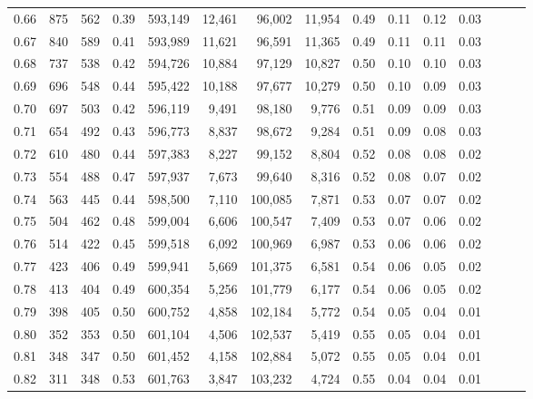 \begin{tabular}{rrrrrrrrrrrrrrr}
0.66 &     875 &    562 &  0.39 &  593,149 &   12,461 &   96,002 &   11,954 &  0.49 &  0.11 &  0.12 &      0.03 \\
0.67 &     840 &    589 &  0.41 &  593,989 &   11,621 &   96,591 &   11,365 &  0.49 &  0.11 &  0.11 &      0.03 \\
0.68 &     737 &    538 &  0.42 &  594,726 &   10,884 &   97,129 &   10,827 &  0.50 &  0.10 &  0.10 &      0.03 \\
0.69 &     696 &    548 &  0.44 &  595,422 &   10,188 &   97,677 &   10,279 &  0.50 &  0.10 &  0.09 &      0.03 \\
0.70 &     697 &    503 &  0.42 &  596,119 &    9,491 &   98,180 &    9,776 &  0.51 &  0.09 &  0.09 &      0.03 \\
0.71 &     654 &    492 &  0.43 &  596,773 &    8,837 &   98,672 &    9,284 &  0.51 &  0.09 &  0.08 &      0.03 \\
0.72 &     610 &    480 &  0.44 &  597,383 &    8,227 &   99,152 &    8,804 &  0.52 &  0.08 &  0.08 &      0.02 \\
0.73 &     554 &    488 &  0.47 &  597,937 &    7,673 &   99,640 &    8,316 &  0.52 &  0.08 &  0.07 &      0.02 \\
0.74 &     563 &    445 &  0.44 &  598,500 &    7,110 &  100,085 &    7,871 &  0.53 &  0.07 &  0.07 &      0.02 \\
0.75 &     504 &    462 &  0.48 &  599,004 &    6,606 &  100,547 &    7,409 &  0.53 &  0.07 &  0.06 &      0.02 \\
0.76 &     514 &    422 &  0.45 &  599,518 &    6,092 &  100,969 &    6,987 &  0.53 &  0.06 &  0.06 &      0.02 \\
0.77 &     423 &    406 &  0.49 &  599,941 &    5,669 &  101,375 &    6,581 &  0.54 &  0.06 &  0.05 &      0.02 \\
0.78 &     413 &    404 &  0.49 &  600,354 &    5,256 &  101,779 &    6,177 &  0.54 &  0.06 &  0.05 &      0.02 \\
0.79 &     398 &    405 &  0.50 &  600,752 &    4,858 &  102,184 &    5,772 &  0.54 &  0.05 &  0.04 &      0.01 \\
0.80 &     352 &    353 &  0.50 &  601,104 &    4,506 &  102,537 &    5,419 &  0.55 &  0.05 &  0.04 &      0.01 \\
0.81 &     348 &    347 &  0.50 &  601,452 &    4,158 &  102,884 &    5,072 &  0.55 &  0.05 &  0.04 &      0.01 \\
0.82 &     311 &    348 &  0.53 &  601,763 &    3,847 &  103,232 &    4,724 &  0.55 &  0.04 &  0.04 &      0.01 \\

\end{tabular}
